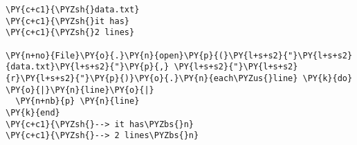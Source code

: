 \begin{Verbatim}[commandchars=\\\{\}]
\PY{c+c1}{\PYZsh{}data.txt}
\PY{c+c1}{\PYZsh{}it has}
\PY{c+c1}{\PYZsh{}2 lines}

\PY{n+no}{File}\PY{o}{.}\PY{n}{open}\PY{p}{(}\PY{l+s+s2}{"}\PY{l+s+s2}{data.txt}\PY{l+s+s2}{"}\PY{p}{,} \PY{l+s+s2}{"}\PY{l+s+s2}{r}\PY{l+s+s2}{"}\PY{p}{)}\PY{o}{.}\PY{n}{each\PYZus{}line} \PY{k}{do} \PY{o}{|}\PY{n}{line}\PY{o}{|}
  \PY{n+nb}{p} \PY{n}{line}
\PY{k}{end}
\PY{c+c1}{\PYZsh{}--> it has\PYZbs{}n}
\PY{c+c1}{\PYZsh{}--> 2 lines\PYZbs{}n}
\end{Verbatim}
